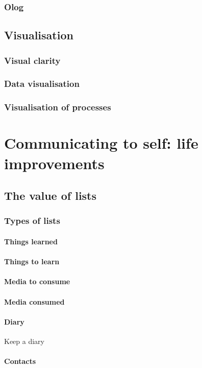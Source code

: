 \documentclass{report}
\begin{document}
\section{Olog}
\chapter{Visualisation}
\section{Visual clarity}
\section{Data visualisation}
\section{Visualisation of processes}

\part{Communicating to self: life improvements}
\setcounter{chapter}{0} %
\chapter{The value of lists}
\section{Types of lists}
\subsection{Things learned}
\subsection{Things to learn}
\subsection{Media to consume}
\subsection{Media consumed}
\subsection{Diary}
Keep a diary
\subsection{Contacts}
\end{document}
